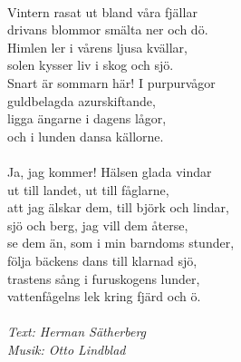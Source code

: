 \vspace{10pt}\\
Vintern rasat ut bland våra fjällar\\
drivans blommor smälta ner och dö.\\
Himlen ler i vårens ljusa kvällar,\\
solen kysser liv i skog och sjö.\\
Snart är sommarn här! I purpurvågor \\
guldbelagda azurskiftande,\\
ligga ängarne i dagens lågor,\\
och i lunden dansa källorne.\\
\\
Ja, jag kommer! Hälsen glada vindar\\
ut till landet, ut till fåglarne,\\
att jag älskar dem, till björk och lindar,\\
sjö och berg, jag vill dem återse,\\
se dem än, som i min barndoms stunder,\\
följa bäckens dans till klarnad sjö,\\
trastens sång i furuskogens lunder,\\
vattenfågelns lek kring fjärd och ö.\\
\\
{\footnotesize\textit{Text: Herman Sätherberg\\ Musik: Otto Lindblad}}
